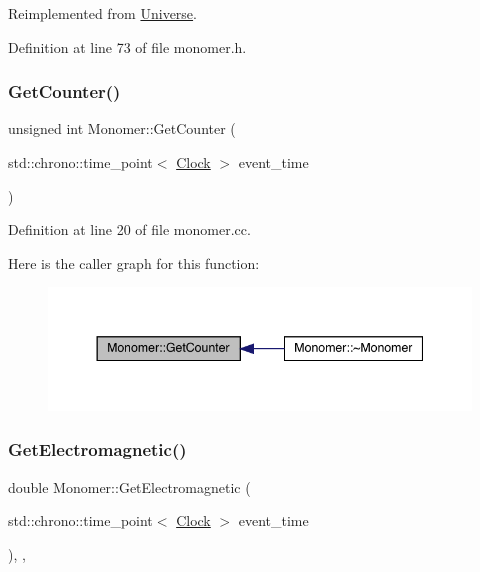 Reimplemented from \hyperlink{class_universe_a46a906baabb63e5d31f8b48ea1fae52e}{Universe}.



Definition at line 73 of file monomer.\+h.

\mbox{\label{class_monomer_a4651a4bd0a41d0698821421043e41126}} 
\subsubsection{\texorpdfstring{Get\+Counter()}{GetCounter()}}
{\footnotesize\ttfamily unsigned int Monomer\+::\+Get\+Counter (\begin{DoxyParamCaption}\item[{std\+::chrono\+::time\+\_\+point$<$ \hyperlink{universe_8h_a0ef8d951d1ca5ab3cfaf7ab4c7a6fd80}{Clock} $>$}]{event\+\_\+time }\end{DoxyParamCaption})}



Definition at line 20 of file monomer.\+cc.

Here is the caller graph for this function\+:
\nopagebreak
\begin{figure}[H]
\begin{center}
\leavevmode
\includegraphics[width=344pt]{class_monomer_a4651a4bd0a41d0698821421043e41126_icgraph}
\end{center}
\end{figure}
\mbox{\label{class_monomer_ad23f4829d66cb20401cc72a9d72ac320}} 
\subsubsection{\texorpdfstring{Get\+Electromagnetic()}{GetElectromagnetic()}}
{\footnotesize\ttfamily double Monomer\+::\+Get\+Electromagnetic (\begin{DoxyParamCaption}\item[{std\+::chrono\+::time\+\_\+point$<$ \hyperlink{universe_8h_a0ef8d951d1ca5ab3cfaf7ab4c7a6fd80}{Clock} $>$}]{event\+\_\+time }\end{DoxyParamCaption})\hspace{0.3cm}{\ttfamily [inline]}, {\ttfamily [final]}, {\ttfamily [virtual]}}



